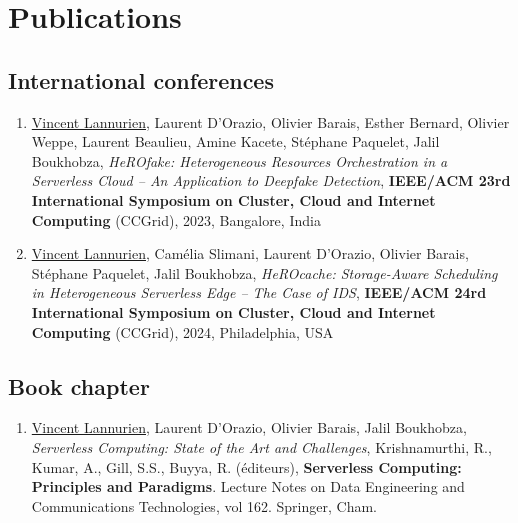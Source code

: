 \chapter*{Publications}

\section*{International conferences}

\begin{enumerate}
    \item \underline{Vincent Lannurien}, Laurent D’Orazio, Olivier Barais, Esther Bernard, Olivier Weppe, Laurent Beaulieu, Amine Kacete, Stéphane Paquelet, Jalil Boukhobza, \textit{{\NoAutoSpacing HeROfake:} Heterogeneous Resources Orchestration in a Serverless Cloud -- An Application to Deepfake Detection}, \textbf{IEEE/ACM 23rd International Symposium on Cluster, Cloud and Internet Computing} (CCGrid), 2023, Bangalore, India
    \item \underline{Vincent Lannurien}, Camélia Slimani, Laurent D’Orazio, Olivier Barais, Stéphane Paquelet, Jalil Boukhobza, \textit{{\NoAutoSpacing HeROcache:} Storage-Aware Scheduling in Heterogeneous Serverless Edge – The Case of IDS}, \textbf{IEEE/ACM 24rd International Symposium on Cluster, Cloud and Internet Computing} (CCGrid), 2024, Philadelphia, USA
\end{enumerate}

\section*{Book chapter}

\begin{enumerate}
    \item \underline{Vincent Lannurien}, Laurent D’Orazio, Olivier Barais, Jalil Boukhobza, \textit{{\NoAutoSpacing Serverless Computing:} State of the Art and Challenges}, Krishnamurthi, R., Kumar, A., Gill, S.S., Buyya, R. (éditeurs), \textbf{{\NoAutoSpacing Serverless Computing:} Principles and Paradigms}. Lecture Notes on Data Engineering and Communications Technologies, vol 162. Springer, Cham.
\end{enumerate}
